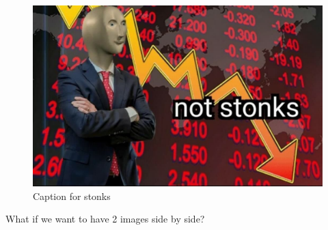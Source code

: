 \documentclass{article}
\begin{document}
\begin{figure}[h] %
    \begin{center} 
        \includegraphics[scale=0.14]{diagram-latex.jpeg}
    \end{center}
    \caption{Caption for stonks}
\end{figure}



What if we want to have 2 images side by side?
\end{document}
